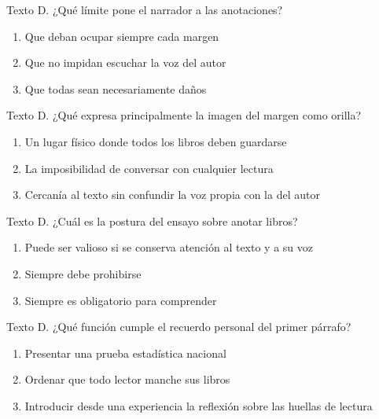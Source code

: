 \noindent\begin{minipage}{\linewidth}\setlength{\parskip}{4pt}\label{q:L-021}
Texto D. ¿Qué límite pone el narrador a las anotaciones?
\begin{enumerate}[label=\Alph*),nosep]
\item Que deban ocupar siempre cada margen
\item Que no impidan escuchar la voz del autor
\item Que todas sean necesariamente daños
\end{enumerate}\end{minipage}\par\medskip

\noindent\begin{minipage}{\linewidth}\setlength{\parskip}{4pt}\label{q:L-022}
Texto D. ¿Qué expresa principalmente la imagen del margen como orilla?
\begin{enumerate}[label=\Alph*),nosep]
\item Un lugar físico donde todos los libros deben guardarse
\item La imposibilidad de conversar con cualquier lectura
\item Cercanía al texto sin confundir la voz propia con la del autor
\end{enumerate}\end{minipage}\par\medskip

\noindent\begin{minipage}{\linewidth}\setlength{\parskip}{4pt}\label{q:L-023}
Texto D. ¿Cuál es la postura del ensayo sobre anotar libros?
\begin{enumerate}[label=\Alph*),nosep]
\item Puede ser valioso si se conserva atención al texto y a su voz
\item Siempre debe prohibirse
\item Siempre es obligatorio para comprender
\end{enumerate}\end{minipage}\par\medskip

\noindent\begin{minipage}{\linewidth}\setlength{\parskip}{4pt}\label{q:L-024}
Texto D. ¿Qué función cumple el recuerdo personal del primer párrafo?
\begin{enumerate}[label=\Alph*),nosep]
\item Presentar una prueba estadística nacional
\item Ordenar que todo lector manche sus libros
\item Introducir desde una experiencia la reflexión sobre las huellas de lectura
\end{enumerate}\end{minipage}\par\medskip


